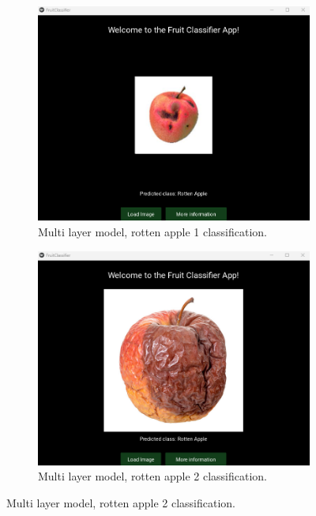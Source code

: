 \documentclass[conference]{IEEEtran}
\begin{document}
\begin{figure}[h]
    \centering
    \begin{subfigure}[b]{0.48\linewidth}
        \centering
        \includegraphics[width=\linewidth]{Mlayer appelR1.png}
        \caption{Multi layer model, rotten apple 1 classification.}
        \label{figFA}
    \end{subfigure}
    \hfill
    \begin{subfigure}[b]{0.48\linewidth}
        \centering
        \includegraphics[width=\linewidth]{Mlayer appelR2.png}
        \caption{Multi layer model, rotten apple 2 classification.}
        \label{figFB}

\end{subfigure}
\end{figure}
\end{document}
